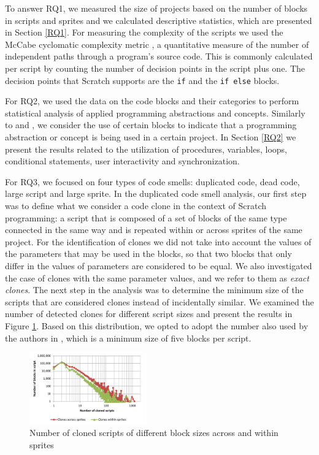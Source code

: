 \documentclass{sig-alternate-05-2015}
\begin{document}
To answer RQ1, we measured the size of projects based on the number of blocks in scripts and sprites and we calculated descriptive statistics, which are presented in Section \ref{RQ1}. For measuring the complexity of the scripts we used the McCabe cyclomatic complexity metric \cite{mcCabe76}, a quantitative measure of the number of independent paths through a program's source code. This is commonly calculated per script by counting the number of decision points in the script plus one. The decision points that Scratch supports are the \texttt{if} and the \texttt{if else} blocks.

For RQ2, we used the data on the code blocks and their categories to perform statistical analysis of applied programming abstractions and concepts. Similarly to \cite{Dasgupta_2016} and \cite{Maloney_2008}, we consider the use of certain blocks to indicate that a programming abstraction or concept is being used in a certain project. In Section \ref{RQ2} we present the results related to the utilization of procedures, variables, loops, conditional statements, user interactivity and synchronization.

For RQ3, we focused on four types of code smells: duplicated code, dead code, large script and large sprite. In the duplicated code smell analysis, our first step was to define what we consider a code clone in the context of Scratch programming: a script that is composed of a set of blocks of the same type connected in the same way and is repeated within or across sprites of the same project. For the identification of clones we did not take into account the values of the parameters that may be used in the blocks, so that two blocks that only differ in the values of parameters are considered to be equal. We also investigated the case of clones with the same parameter values, and we refer to them as \textit{exact clones}. The next step in the analysis was to determine the minimum size of the scripts that are considered clones instead of incidentally similar. We examined the number of detected clones for different script sizes and present the results in Figure \ref{fig:cloneslines}. Based on this distribution, we opted to adopt the number also used by the authors in \cite{moreno_automatic_2014}, which is a minimum size of five blocks per script.

\begin{figure}
	\centering
	\includegraphics[width=0.45\textwidth]{fig/charts/11cloneslines}
	\vspace{-1em}
	\caption{Number of cloned scripts of different block sizes across and within sprites}
	\label{fig:cloneslines}
\end{figure}
\end{document}
